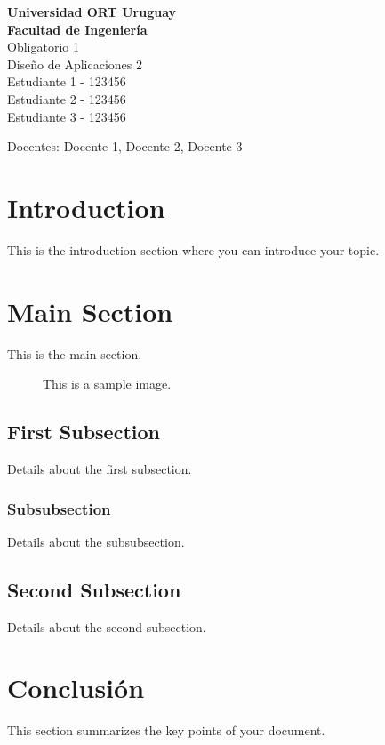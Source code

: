 \documentclass{article}
\begin{document}
\begin{titlepage}
	\center

	\vspace*{1cm}
	{\Huge\bfseries Universidad ORT Uruguay}\\[0.4cm]
	{\Huge\bfseries Facultad de Ingeniería}\\[3cm]

	{\Huge Obligatorio 1}\\[0.5cm]
	{\Huge Diseño de Aplicaciones 2}\\[3cm]

	{\Large Estudiante 1 - 123456}\\[0.5cm]
	{\Large Estudiante 2 - 123456}\\[0.5cm]
	{\Large Estudiante 3 - 123456}\\[0.5cm]

	\vfill

	{\Large Docentes: Docente 1, Docente 2, Docente 3}\\[0.5cm]

	\vfill

	{\huge\bfseries\the\year}
	\vfill

\end{titlepage}

\tableofcontents

\pagebreak

\section{Introduction}
This is the introduction section where you can introduce your topic.

\section{Main Section}
This is the main section.

\begin{figure}[h]
	\caption{This is a sample image.}
\end{figure}

\subsection{First Subsection}
Details about the first subsection.

\subsubsection{Subsubsection}
Details about the subsubsection.

\subsection{Second Subsection}
Details about the second subsection.

\section{Conclusión}
This section summarizes the key points of your document.
\end{document}
